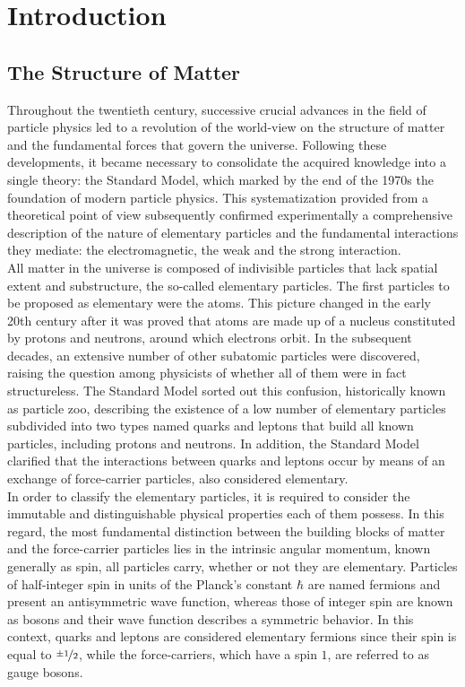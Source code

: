 \documentclass[12pt,a4paper]{report}
\begin{document}
\chapter{Introduction}
\section{The Structure of Matter}
\label{sec:DasSMT}
Throughout the twentieth century, successive crucial advances in the field of particle physics led to a revolution of the world-view on the structure of matter and the fundamental forces that govern the universe. Following these developments, it became necessary to consolidate the acquired knowledge into a single theory: the Standard Model, which marked by the end of the 1970s the foundation of modern particle physics. This systematization provided from a theoretical point of view subsequently confirmed experimentally a comprehensive description of the nature of elementary particles and the fundamental interactions they mediate: the electromagnetic, the weak and the strong interaction. \\
All matter in the universe is composed of indivisible particles that lack spatial extent and substructure, the so-called elementary particles. The first particles to be proposed as elementary were the atoms. This picture changed in the early 20th century after it was proved that atoms are made up of a nucleus constituted by protons and neutrons, around which electrons orbit. In the subsequent decades, an extensive number of other subatomic particles were discovered, raising the question among physicists of whether all of them were in fact structureless. The Standard Model sorted out this confusion, historically known as particle zoo, describing the existence of a low number of elementary particles subdivided into two types named quarks and leptons that build all known particles, including protons and neutrons. In addition, the Standard Model clarified that the interactions between quarks and leptons occur by means of an exchange of force-carrier particles, also considered elementary. \\
In order to classify the elementary particles, it is required to consider the immutable and distinguishable physical properties each of them possess. In this regard, the most fundamental distinction between the building blocks of matter and the force-carrier particles lies in the intrinsic angular momentum, known generally as spin, all particles carry, whether or not they are elementary. Particles of half-integer spin in units of the Planck's constant $\hbar$ are named fermions and present an antisymmetric wave function, whereas those of integer spin are known as bosons and their wave function describes a symmetric behavior. In this context, quarks and leptons are considered elementary fermions since their spin is equal to $\nicefrac{\pm 1}{2}$, while the force-carriers, which have a spin $1$, are referred to as gauge bosons.\\
\end{document}
